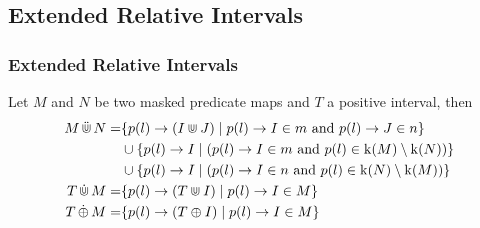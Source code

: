 \subsection{Extended Relative Intervals}
\begin{frame}
    \frametitle{Extended Relative Intervals}

    \begin{definition}
        \label{def:e-rel-int-ops}
        Let $M$ and $N$ be two masked predicate maps and $T$ a positive interval, then 
        \begin{align*}
            M \,\ddot{\Cup}\, N = 
                & \{ p(l) \rightarrow (I \Cup J) \mid 
                    p(l) \rightarrow I \in m \text{ and } 
                    p(l) \rightarrow J \in n \} \\
                & \cup \{p(l) \rightarrow I \mid  
                    (p(l) \rightarrow I \in m \text{ and }
                    p(l) \in \operatorname{k}(M) \setminus \operatorname{k}(N)) \} \\
                & \cup \{p(l) \rightarrow I \mid  
                    (p(l) \rightarrow I \in n \text{ and }
                    p(l) \in \operatorname{k}(N) \setminus \operatorname{k}(M))
                    \} \\
            T \,\dot{\Cup}\, M = 
                & \{ p(l) \rightarrow (T \Cup I) \mid 
                    p(l) \rightarrow I \in M \} \\
            T \,\dot{\oplus}\, M = 
                & \{ p(l) \rightarrow (T \oplus I) \mid 
                    p(l) \rightarrow I \in M \} \\
        \end{align*}
    \end{definition}
    
\end{frame}


